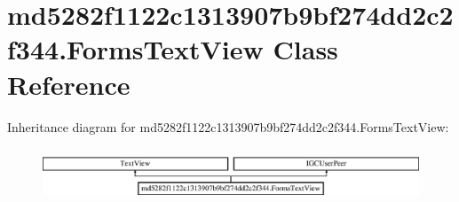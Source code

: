 \hypertarget{classmd5282f1122c1313907b9bf274dd2c2f344_1_1FormsTextView}{}\section{md5282f1122c1313907b9bf274dd2c2f344.\+Forms\+Text\+View Class Reference}
\label{classmd5282f1122c1313907b9bf274dd2c2f344_1_1FormsTextView}
Inheritance diagram for md5282f1122c1313907b9bf274dd2c2f344.\+Forms\+Text\+View\+:\begin{figure}[H]
\begin{center}
\leavevmode
\includegraphics[height=1.609195cm]{classmd5282f1122c1313907b9bf274dd2c2f344_1_1FormsTextView}
\end{center}
\end{figure}
